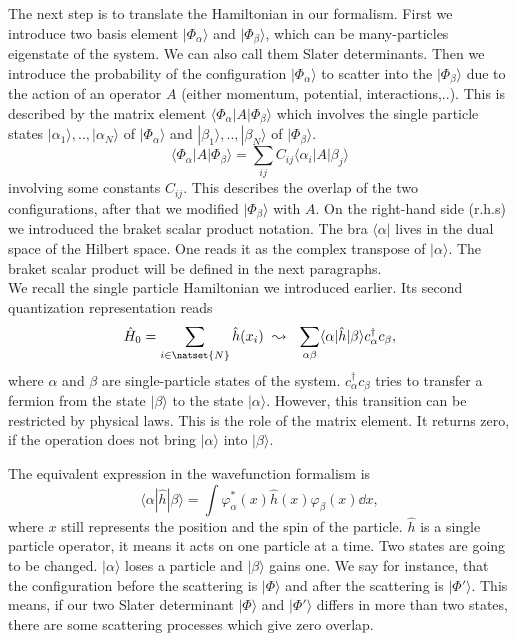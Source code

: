 \documentclass[../main.tex]{subfile}
\begin{document}
The next step is to translate the Hamiltonian in our formalism.
First we introduce two basis element $|\Phi_{\alpha}\rangle$ and $|\Phi_{\beta}\rangle$, which can be many-particles eigenstate of the system.
We can also call them Slater determinants.
Then we introduce the probability of the configuration $|\Phi_{\alpha}\rangle$ to scatter into the $|\Phi_{\beta}\rangle$ due to the action of an operator $A$ (either momentum, potential, interactions,..).
This is described by the matrix element $\langle\Phi_{\alpha}|A|\Phi_{\beta}\rangle$ which involves the single particle states $|\alpha_1\rangle, .., |\alpha_N\rangle$ of $|\Phi_{\alpha}\rangle$
and $|\beta_1\rangle, ..,|\beta_N\rangle$ of $|\Phi_{\beta}\rangle$.
\[
    \langle\Phi_{\alpha}|A|\Phi_{\beta}\rangle = \sum_{ij} C_{ij}\langle\alpha_i|A|\beta_j\rangle
\]
involving some constants $C_{ij}$. This describes the overlap of the two configurations, after that we modified $|\Phi_{\beta}\rangle$ with $A$.
On the right-hand side (r.h.s) we introduced the braket scalar product notation. The bra $\langle\alpha|$ lives in the dual space
of the Hilbert space. One reads it as the complex transpose of $|\alpha\rangle$. The braket scalar product will be defined in the next paragraphs.\\

We recall the single particle Hamiltonian we introduced earlier. Its second quantization representation reads
\begin{equation}\label{eq:SecondquantizationSingleParticle}
    \hat{H}_0 = \sum_{i \in \natset{N}} \hat{h}(x_i) ~ \leadsto ~~ \sum_{\alpha\beta} \langle \alpha|\hat{h}|\beta\rangle c_{\alpha}^{\dagger}c_{\beta},
\end{equation}
where $\alpha$ and $\beta$ are single-particle states of the system. $c_{\alpha}^{\dagger}c_{\beta}$ tries to transfer a fermion
from the state $|\beta\rangle$ to the state $|\alpha\rangle$. However, this transition can be restricted by physical laws. This is the role of the matrix element.
It returns zero, if the operation does not bring $|\alpha\rangle$ into $|\beta\rangle$.

The equivalent expression in the wavefunction formalism is
\begin{equation}\label{eq:Translation_TwoStateOverlap}  
    \langle \alpha|\hat{h}|\beta\rangle = \int  \varphi_{\alpha}^{\ast}(x) \hat{h}(x) \varphi_{\beta}(x) \dd x,
\end{equation}
where $x$ still represents the position and the spin of the particle.
$\hat{h}$ is a single particle operator, it means it acts on one particle at a time.
Two states are going to be changed. $|\alpha\rangle$ loses a particle and $|\beta\rangle$ gains one. We say for instance, that the 
configuration before the scattering is $|\Phi\rangle$ and after the scattering is $|\Phi'\rangle$. 
This means, if our two Slater determinant $|\Phi\rangle$ and $|\Phi'\rangle$ differs in more than two states, there are some scattering processes which give zero overlap.
\end{document}
